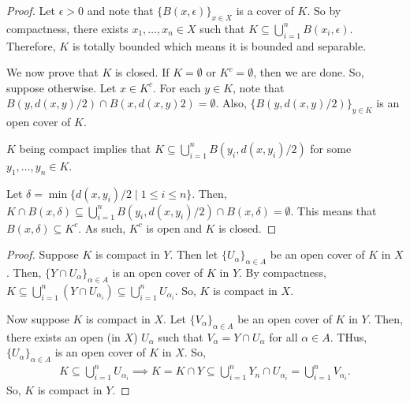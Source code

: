 \documentclass{report}
\begin{document}
\begin{proof}
    Let $\epsilon > 0$ and note that $\{B(x, \epsilon)\}_{x \in X}$ is a cover of $K$. So by compactness, there exists $x_1, \ldots, x_n \in X$ such that $K \subseteq \bigcup_{i = 1}^n B(x_i, \epsilon)$. Therefore, $K$ is totally bounded which means it is bounded and separable.

    We now prove that $K$ is closed. If $K = \emptyset$ or $K^c = \emptyset$, then we are done. So, suppose otherwise. Let $x \in K^c$. For each $y \in K$, note that $B(y, d(x, y)/ 2) \cap B(x, d(x, y)  2) = \emptyset$. Also, $\{B(y, d(x, y)/2)\}_{y \in K}$ is an open cover of $K$.

    $K$ being compact implies that $K \subseteq \bigcup_{i=1}^n B(y_i, d(x, y_i)/2)$ for some $y_1, \ldots, y_n \in K$. 

    Let $\delta = \min\{d(x, y_i)/2 \mid 1 \leq i \leq n\}$. Then, $K \cap B(x, \delta) \subseteq \bigcup_{i=1}^n B(y_i, d(x, y_i)/2) \cap B(x, \delta) = \emptyset$. This means that $B(x, \delta) \subseteq K^c$. As such, $K^c$ is open and $K$ is closed.
\end{proof}


\begin{proof}
    Suppose $K$ is compact in $Y$. Then let $\{U_\alpha\}_{\alpha \in A}$ be an open cover of $K$ in $X$. Then, $\{Y \cap U_\alpha\}_{\alpha \in A}$ is an open cover of $K$ in $Y$. By compactness, $K \subseteq \bigcup_{i=1}^n (Y \cap U_{\alpha_i}) \subseteq \bigcup_{i=1}^n U_{\alpha_i}$. So, $K$ is compact in $X$.

    Now suppose $K$ is compact in $X$. Let $\{V_{\alpha}\}_{\alpha \in A}$ be an open cover of $K$ in $Y$. Then, there exists an open (in $X$) $U_\alpha$ such that $V_\alpha = Y \cap U_\alpha$ for all $\alpha \in A$. THus, $\{U_\alpha\}_{\alpha \in A}$ is an open cover of $K$ in $X$. So,
    \begin{align*}
        K \subseteq \bigcup_{i=1}^n U_{\alpha_i} \implies K = K \cap Y \subseteq \bigcup_{i=1}^n Y_n \cap U_{\alpha_i} = \bigcup_{i=1}^n V_{\alpha_i}.
    \end{align*}
    So, $K$ is compact in $Y$.
\end{proof}
\end{document}
